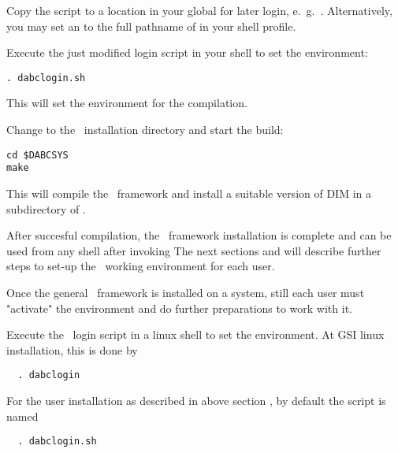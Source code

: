 \item Copy the script to a location in your global  for later login,
e.~g.\ . Alternatively, you
may set an  to the full pathname of  in your shell profile.
\ebul

\item Execute the just modified login script in your shell to set the environment:  
\begin{small}
\begin{verbatim}
. dabclogin.sh
\end{verbatim} 
\end{small}
This will set the environment for the compilation.

\item Change to the \dabc\ installation directory and start the build:
\begin{small}
\begin{verbatim}
cd $DABCSYS
make
\end{verbatim} 
\end{small}
This will compile the \dabc\ framework and install a suitable version of DIM in a
subdirectory of .

\enum

After succesful compilation, the \dabc\ framework installation is complete
and can be used from any shell after invoking 
The next sections  and  will describe further steps 
to set-up the \dabc\ working environment for each user.


Once the general \dabc\ framework is installed on a system, still each user
must "activate" the environment and do further preparations to work with it.

\bnum
\item Execute the \dabc\ login script in a linux shell to set the environment.
At GSI linux installation, this is done by  
\begin{small}
\begin{verbatim}
  . dabclogin
\end{verbatim} 
\end{small}
For the user installation as described in above section ,
by default the script is named   
\begin{small}
\begin{verbatim}
  . dabclogin.sh
\end{verbatim}
\end{small}


